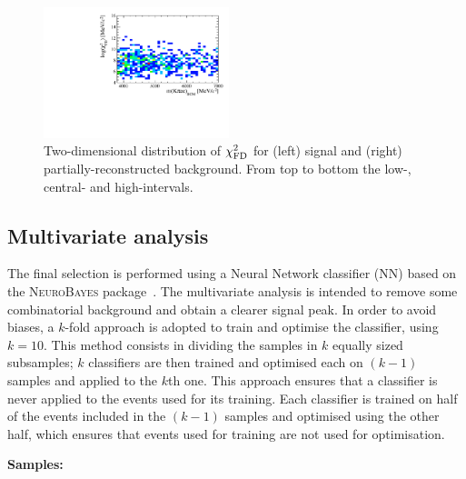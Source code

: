 \begin{figure}[t!]
\includegraphics[width=0.48\textwidth]{RKst/figs/HOP/HOP_bkg_high.pdf}
\caption{Two-dimensional distribution of $\chi^2_{\rm FD}$ \vs \mbcm for (left) \BdToKstee signal and (right) partially-reconstructed background.
From top to bottom the low-, central- and high-\qsq intervals.}
\label{fig:hop}

\end{figure}


\subsection{Multivariate analysis}
\label{sec:RKst_mva}

The final selection is performed using a Neural Network classifier (NN) based on the \textsc{NeuroBayes}
package~\cite{Feindt:2006pm,feindt-2004}. The multivariate analysis is intended to remove
some combinatorial background and obtain a clearer signal peak. In order to avoid biases, a $k$-fold
approach is adopted to train and optimise the classifier, using $k=10$. This method consists in dividing the samples
in $k$ equally sized subsamples; $k$ classifiers are then trained and optimised each on $(k-1)$ samples 
and applied to the $k$th one. This approach ensures that a classifier is never applied to the events used for its training.
Each classifier is trained on half of the events included in the $(k-1)$ samples and optimised using the other half,
which ensures that events used for training are not used for optimisation.

{\bf Samples:}

